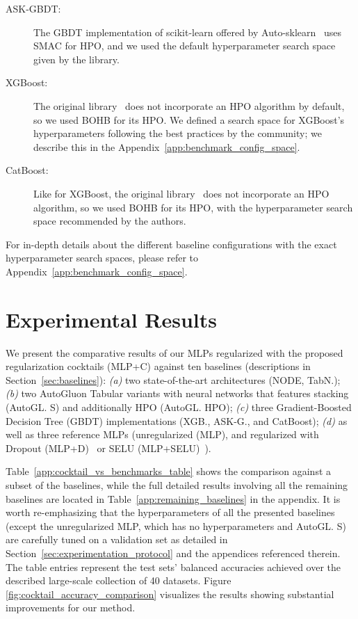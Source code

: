 \begin{description}
    \item[ASK-GBDT:] The GBDT implementation of scikit-learn offered by Auto-sklearn~\citep{autosklearn} uses SMAC for HPO, and we used the default hyperparameter search space given by the library.
    \item[XGBoost:] The original library~\citep{Chen:2016:XST:2939672.2939785} does not incorporate an HPO algorithm by default, so we used BOHB for its HPO. We defined a search space for XGBoost's hyperparameters following the best practices by the community; we describe this in the Appendix~\ref{app:benchmark_config_space}.
    \item[CatBoost:] Like for XGBoost, the original library~\citep{prokhorenkova2018catboost} does not incorporate an HPO algorithm, so we used BOHB for its HPO, with the hyperparameter search space recommended by the authors. 
 \end{description}

For in-depth details about the different baseline configurations with the exact hyperparameter search spaces, please refer to Appendix~\ref{app:benchmark_config_space}.

\section{Experimental Results}
\label{sec:results}

We present the comparative results of our MLPs regularized with the proposed regularization cocktails (MLP+C) against ten baselines (descriptions in Section~\ref{sec:baselines}): \textit{(a)} two state-of-the-art architectures (NODE, TabN.); \textit{(b)} two AutoGluon Tabular variants with neural networks that features stacking (AutoGL. S) and additionally HPO (AutoGL. HPO); \textit{(c)} three Gradient-Boosted Decision Tree (GBDT) implementations (XGB., ASK-G., and CatBoost); \textit{(d)} as well as three reference MLPs (unregularized (MLP), and regularized with Dropout (MLP+D)~\citep{10.5555/2627435.2670313} or SELU (MLP+SELU)~\citep{NIPS2017_5d44ee6f}). 

Table~\ref{app:cocktail_vs_benchmarks_table} shows the comparison against a subset of the baselines, while the full detailed results involving all the remaining baselines are located in Table~\ref{app:remaining_baselines} in the appendix. It is worth re-emphasizing that the hyperparameters of all the presented baselines (except the unregularized MLP, which has no hyperparameters and AutoGL. S) are carefully tuned on a validation set as detailed in Section~\ref{sec:experimentation_protocol} and the appendices referenced therein. The table entries represent the test sets' balanced accuracies achieved over the described large-scale collection of 40 datasets. Figure \ref{fig:cocktail_accuracy_comparison} visualizes the results showing substantial improvements for our method.

